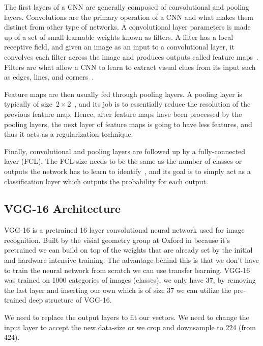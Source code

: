 The first layers of a CNN are generally composed of convolutional and pooling layers. Convolutions are the primary operation of a CNN and what makes them distinct from other type of networks. A convolutional layer parameters is made up of a set of small learnable weights known as filters. A filter has a local receptive field, and given an image as an input to a convolutional layer, it convolves each filter across the image and produces outputs called feature maps~\cite{cnn-star-galaxy}. Filters are what allow a CNN to learn to extract visual clues from its input such as edges, lines, and corners~\cite{Lecun99objectrecognition}.

Feature maps are then usually fed through pooling layers. A pooling layer is typically of size~$2 \times 2$~\cite{NIPS2012_4824}, and  its job is to essentially reduce the resolution of the previous feature map. Hence, after feature maps have been processed by the pooling layers, the next layer of feature maps is going to have less features, and thus it acts as a regularization technique.

Finally, convolutional and pooling layers are followed up by a fully-connected layer (FCL). The FCL size needs to be the same as the number of classes or outputs the network has to learn to identify~\cite{Ciresan11flexible}, and its goal is to simply act as a classification layer which outputs the probability for each output.

\subsection{VGG-16 Architecture}

VGG-16 is a pretrained 16 layer convolutional neural network used for image recognition. Built by the visial geometry group at Oxford in \citeyear{vgg16-arxiv} \cite{vgg16-arxiv} because it's pretrained we can build on top of the weights that are already set by the initial and hardware intensive training. The advantage behind this is that we don't have to train the neural network from scratch we can use transfer learning. VGG-16 was trained on 1000 categories of images (classes), we only have 37, by removing the last layer and inserting our own which is of size 37 we can utilize the pre-trained deep structure of VGG-16.



We need to replace the output layers to fit our vectors.
We need to change the input layer to accept the new data-size or we crop and downsample to 224 (from 424).

